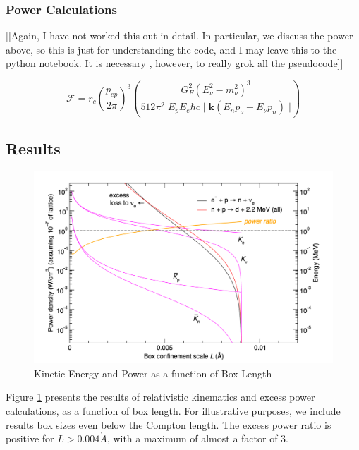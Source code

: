 \documentclass[%
 aip,
 jmp,%
 amsmath,amssymb,
 reprint,%
]{revtex4-1}
\begin{document}
\subsubsection{Power Calculations}

[[Again, I have not worked this out in detail.  In particular, we discuss the power above, so this is just for understanding the code, and I may leave this to the python notebook. It is necessary , however, to really grok all the pseudocode]]

$$\mathcal{F}=r_{c}\left(\dfrac{p_{ep}}{2\pi}\right)^{3}\left(\dfrac{G_{F}^{2}(E_{\nu}^{2}-m_{\nu}^{2})^{3}}{512\pi^{2}\;E_{p}E_{e}\hbar c\;\big\vert\; \mathbf{k}(E_{n}p_{\nu}-E_{\nu}p_{n})\;\big\vert}\right)$$

\subsection{Results}



\begin{figure}
 \begin{minipage}{\linewidth}
   \includegraphics[scale=0.5]{img/results.png}
   \caption{Kinetic Energy and Power as a function of Box Length}
  \label{fig:results}
\end{minipage}
\end{figure}


Figure \ref{fig:results} presents the results of relativistic kinematics and excess power calculations, as a function of box length.
For illustrative purposes, we include results box sizes even below the Compton length.  The excess power ratio is positive for $L>0.004\mathring{A}$, with a maximum of almost a factor of 3.
\end{document}
